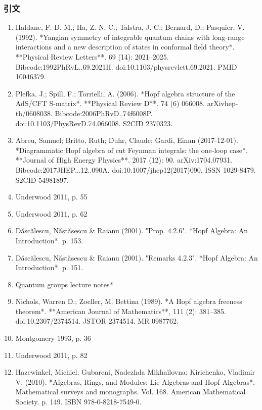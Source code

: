 \subsubsection{引文}
\begin{enumerate}
\item Haldane, F. D. M.; Ha, Z. N. C.; Talstra, J. C.; Bernard, D.; Pasquier, V. (1992). *Yangian symmetry of integrable quantum chains with long-range interactions and a new description of states in conformal field theory*. **Physical Review Letters**. 69 (14): 2021–2025. Bibcode:1992PhRvL..69.2021H. doi:10.1103/physrevlett.69.2021. PMID 10046379.

\item Plefka, J.; Spill, F.; Torrielli, A. (2006). *Hopf algebra structure of the AdS/CFT S-matrix*. **Physical Review D**. 74 (6) 066008. arXiv\:hep-th/0608038. Bibcode:2006PhRvD..74f6008P. doi:10.1103/PhysRevD.74.066008. S2CID 2370323.

\item Abreu, Samuel; Britto, Ruth; Duhr, Claude; Gardi, Einan (2017-12-01). *Diagrammatic Hopf algebra of cut Feynman integrals: the one-loop case*. **Journal of High Energy Physics**. 2017 (12): 90. arXiv:1704.07931. Bibcode:2017JHEP...12..090A. doi:10.1007/jhep12(2017)090. ISSN 1029-8479. S2CID 54981897.

\item Underwood 2011, p. 55

\item Underwood 2011, p. 62

\item Dăscălescu, Năstăsescu & Raianu (2001). "Prop. 4.2.6". *Hopf Algebra: An Introduction*. p. 153.

\item Dăscălescu, Năstăsescu & Raianu (2001). "Remarks 4.2.3". *Hopf Algebra: An Introduction*. p. 151.

\item Quantum groups lecture notes*

\item Nichols, Warren D.; Zoeller, M. Bettina (1989). *A Hopf algebra freeness theorem*. **American Journal of Mathematics**, 111 (2): 381–385. doi:10.2307/2374514. JSTOR 2374514. MR 0987762.

\item Montgomery 1993, p. 36

\item Underwood 2011, p. 82

\item Hazewinkel, Michiel; Gubareni, Nadezhda Mikhaĭlovna; Kirichenko, Vladimir V. (2010). *Algebras, Rings, and Modules: Lie Algebras and Hopf Algebras*. Mathematical surveys and monographs. Vol. 168. American Mathematical Society. p. 149. ISBN 978-0-8218-7549-0.


\end{enumerate}
